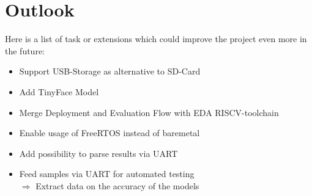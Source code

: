 \documentclass[oneside]{tum-book}
\begin{document}
\section{Outlook}

Here is a list of task or extensions which could improve the project even more in the future:

\begin{itemize}
    \item Support USB-Storage as alternative to SD-Card
    \item Add TinyFace Model\cite{teodorfratiloiu2020}
    \item Merge Deployment and Evaluation Flow with EDA RISCV-toolchain
    \item Enable usage of FreeRTOS instead of baremetal
    \item Add possibility to parse results via UART
    \item Feed samples via UART for automated testing\\[2em]
    $\Rightarrow$ Extract data on the accuracy of the models
\end{itemize}

\backmatter



\end{document}
